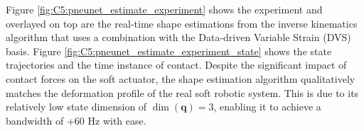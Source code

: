 Figure \ref{fig:C5:pneunet_estimate_experiment} shows the experiment and overlayed on top are the real-time shape estimations from the inverse kinematics algorithm that uses a combination with the Data-driven Variable Strain (DVS) basis. Figure \ref{fig:C5:pneunet_estimate_experiment_state} shows the state trajectories and the time instance of contact. Despite the significant impact of contact forces on the soft actuator, the shape estimation algorithm qualitatively matches the deformation profile of the real soft robotic system. This is due to its relatively low state dimension of $\dim(\mathbf{q}) = 3$, enabling it to achieve a bandwidth of +60 \si{\hertz} with ease.
\vfill
